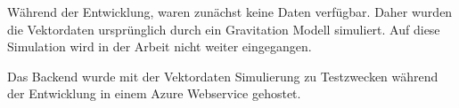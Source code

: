 Während der Entwicklung, waren zunächst keine Daten verfügbar.
Daher wurden die Vektordaten ursprünglich durch ein Gravitation Modell
simuliert. Auf diese Simulation wird in der Arbeit nicht weiter
eingegangen.

Das Backend wurde mit der Vektordaten Simulierung zu Testzwecken während
der Entwicklung in einem Azure Webservice gehostet.

%	
%		
%	
%				
%		
%		


